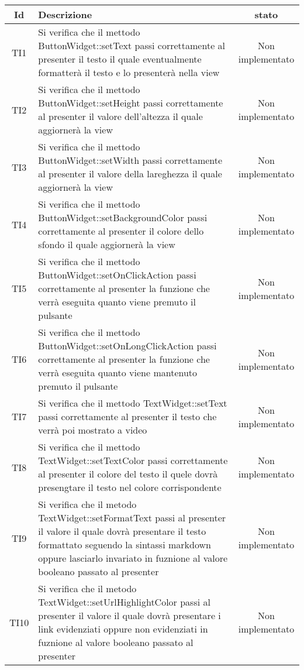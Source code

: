 \begin{center}
	\begin{longtable}{|c|>{\centering}m{10cm}|c|}\hline
		Id & Descrizione & stato \\ \hline
		TI1 & Si verifica che il mettodo ButtonWidget::setText passi correttamente al presenter il testo il  quale eventualmente formatterà il testo e lo presenterà nella view & Non implementato \\ \hline
		TI2 & Si verifica che il mettodo ButtonWidget::setHeight passi correttamente al presenter il valore dell'altezza il quale aggiornerà la view & Non implementato \\ \hline
		TI3 & Si verifica che il mettodo ButtonWidget::setWidth passi correttamente al presenter il valore della lareghezza il quale aggiornerà la view & Non implementato \\ \hline
		TI4 & Si verifica che il mettodo ButtonWidget::setBackgroundColor passi correttamente al presenter il colore dello sfondo il quale aggiornerà la view & Non implementato \\ \hline
		TI5 & Si verifica che il mettodo ButtonWidget::setOnClickAction passi correttamente al presenter la funzione che verrà eseguita quanto viene premuto il pulsante & Non implementato \\ \hline
		TI6 & Si verifica che il mettodo ButtonWidget::setOnLongClickAction passi correttamente al presenter la funzione che verrà eseguita quanto viene mantenuto premuto il pulsante & Non implementato \\ \hline
		TI7 & Si verifica che il mettodo TextWidget::setText passi correttamente al presenter il testo che verrà poi mostrato a video & Non implementato \\ \hline
		TI8 & Si verifica che il mettodo TextWidget::setTextColor passi correttamente al presenter il colore del testo il quele dovrà presengtare il testo nel colore corrispondente & Non implementato \\ \hline
		TI9 & Si verifica che il metodo TextWidget::setFormatText passi al presenter il valore il quale dovrà presentare il testo formattato seguendo la sintassi markdown oppure lasciarlo invariato in fuznione al valore booleano passato al presenter & Non implementato \\ \hline
		TI10 & Si verifica che il metodo TextWidget::setUrlHighlightColor passi al presenter il valore il quale dovrà presentare i link evidenziati oppure non evidenziati in fuznione al valore booleano passato al presenter & Non implementato \\ \hline

\end{longtable}
\end{center}
